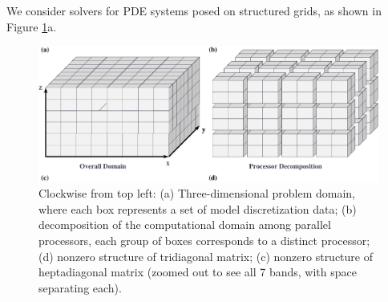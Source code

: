 \documentclass[final]{siamltex}
\renewcommand{\(}{\left(}
\renewcommand{\)}{\right)}
\begin{document}
We consider solvers for PDE systems posed on structured grids, as
shown in Figure \ref{fig:plots}a.
\begin{figure}[t]
\begin{minipage}[l]{0.3 \textwidth}
\caption{Clockwise from top left: 
  (a) Three-dimensional problem domain, where each box represents a
  set of model discretization data; (b) decomposition of the
  computational domain among parallel processors, each group of boxes
  corresponds to a distinct processor; (d) nonzero
  structure of tridiagonal matrix; (c) nonzero structure of
  heptadiagonal matrix (zoomed out to see all 7 bands, with space
  separating each).} 
\label{fig:plots}
\vspace{2.4cm}

\end{minipage}
\hspace{0.2cm}
\begin{minipage}[r]{0.6 \textwidth}
\centering
\includegraphics[scale=0.35]{dom_decomp} 


\end{minipage}
\end{figure}
\end{document}

